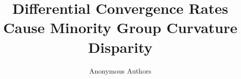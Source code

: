 \documentclass{article}
\title{Differential Convergence Rates Cause Minority Group Curvature Disparity}
\author{Anonymous Authors}
\date{}
\begin{document}
\maketitle

\begin{abstract}

\end{abstract}

















\end{document}
